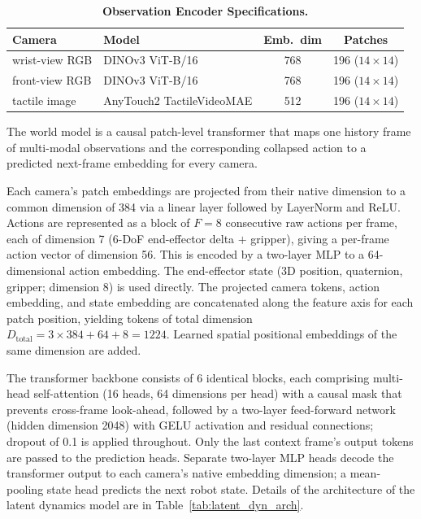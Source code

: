   \begin{table}[h]
  \centering
  \caption{\textbf{Observation Encoder Specifications.}}
  \label{tab:encoders}
  \begin{tabular}{llcc}
  \toprule
  \textbf{Camera} & \textbf{Model} & \textbf{Emb.\ dim} & \textbf{Patches} \\
  \midrule
  wrist-view RGB & DINOv3 ViT-B/16 & 768 & 196 ($14{\times}14$) \\
  front-view RGB & DINOv3 ViT-B/16 & 768 & 196 ($14{\times}14$) \\
  tactile image   & AnyTouch2 TactileVideoMAE & 512 & 196 ($14{\times}14$) \\
  \bottomrule
  \end{tabular}
  \label{tab:observation_encoders}
  \end{table}
  
  The world model is a causal patch-level transformer that maps
  one history frame of multi-modal observations and the corresponding collapsed action to a
  predicted next-frame embedding for every camera.

  Each camera's patch embeddings are projected from their native dimension to a common dimension of
  384 via a linear layer followed by LayerNorm and ReLU.
  Actions are represented as a block of $F=8$ consecutive raw actions per frame, each of dimension 7
  (6-DoF end-effector delta $+$ gripper), giving a per-frame action vector of dimension 56.
  This is encoded by a two-layer MLP to a 64-dimensional action embedding.
  The end-effector state (3D position, quaternion, gripper; dimension 8) is used directly.
  The projected camera tokens, action embedding, and state embedding are concatenated along the
  feature axis for each patch position, yielding tokens of total dimension $D_{\text{total}} =
  3{\times}384 + 64 + 8 = 1224$.
  Learned spatial positional embeddings of the same
  dimension are added.

  The transformer backbone consists of 6 identical blocks, each comprising multi-head self-attention
  (16 heads, 64 dimensions per head) with a causal mask that prevents cross-frame look-ahead,
  followed by a two-layer feed-forward network (hidden dimension 2048) with GELU activation and
  residual connections; dropout of 0.1 is applied throughout.
  Only the last context frame's output tokens are passed to the prediction heads.
  Separate two-layer MLP heads decode the transformer output to each camera's native embedding
  dimension; a mean-pooling state head predicts the next robot state. Details of the architecture of the latent dynamics model are in Table~\ref{tab:latent_dyn_arch}.

